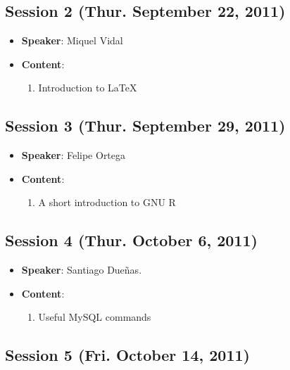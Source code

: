 \documentclass[a4paper]{article}
\begin{document}
\subsection{Session 2 (Thur. September 22, 2011)}

\begin{itemize}
 \item \textbf{Speaker}: Miquel Vidal

 \item \textbf{Content}:

  \begin{enumerate}
   \item Introduction to LaTeX
  \end{enumerate}

\end{itemize}

\subsection{Session 3 (Thur. September 29, 2011)}

\begin{itemize}
 \item \textbf{Speaker}: Felipe Ortega

  \item \textbf{Content}:

  \begin{enumerate}
   \item A short introduction to GNU R
  \end{enumerate}

\end{itemize}

\subsection{Session 4 (Thur. October 6, 2011)}

  \begin{itemize}
   \item \textbf{Speaker}: Santiago Dueñas.

   \item \textbf{Content}:

   \begin{enumerate}
    \item Useful MySQL commands
   \end{enumerate}

  \end{itemize}

\subsection{Session 5 (Fri. October 14, 2011)}
\end{document}
